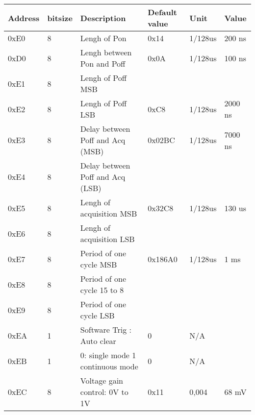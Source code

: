     \vspace{-10pt}
\begin{table}[!htbp]
\small
\begin{tabular}{|l|l|l|l|l|l|}
\hline
Address & bitsize & Description                                & Default value & Unit         & Value     \\ \hline \hline
0xE0    & 8           & Lengh of Pon                               & 0x14                 & 1/128us         & 200 ns    \\ \hline
0xD0    & 8           & Lengh between Pon and Poff                 & 0x0A                 & 1/128us         & 100 ns    \\ \hline
0xE1    & 8           & Lengh of Poff MSB                          &                      &              &           \\ \hline
0xE2    & 8           & Lengh of Poff LSB                          & 0xC8                 & 1/128us         & 2000 ns   \\ \hline
0xE3    & 8           & Delay between Poff and Acq (MSB)    & 0x02BC               & 1/128us         & 7000 ns   \\ \hline
0xE4    & 8           & Delay between Poff and Acq (LSB)    &                      &              &           \\ \hline
0xE5    & 8           & Lengh of acquisition MSB                   & 0x32C8               & 1/128us         & 130 us    \\ \hline
0xE6    & 8           & Lengh of acquisition LSB                   &                      &              &           \\ \hline
0xE7    & 8           & Period of one cycle MSB                    & 0x186A0              & 1/128us         & 1 ms      \\ \hline
0xE8    & 8           & Period of one cycle 15 to 8                &                      &              &           \\ \hline
0xE9    & 8           & Period of one cycle LSB                    &                      &              &           \\ \hline
0xEA    & 1           & Software Trig : Auto clear                 & 0                    & N/A          &           \\ \hline
0xEB    & 1           & 0: single mode 1 continuous mode           & 0                    & N/A          &           \\ \hline
0xEC    & 8           & Voltage gain control: 0V to 1V             & 0x11                 & 0,004        & 68 mV     \\ \hline

\end{tabular}
\end{table}
